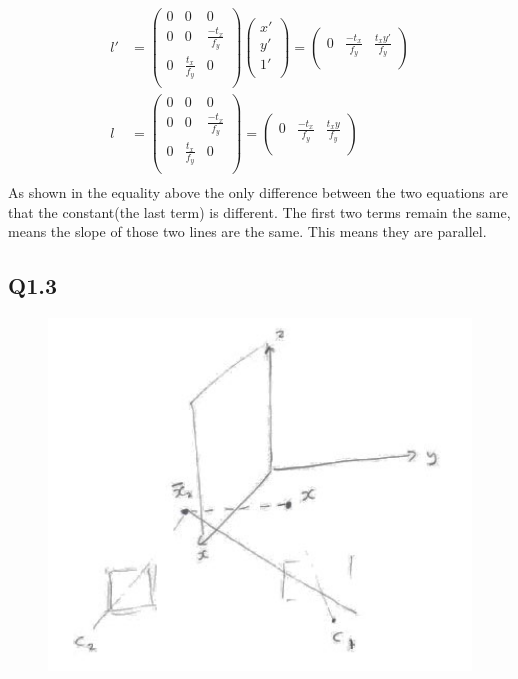 \documentclass{article}
\begin{document}
\begin{equation*}
\begin{aligned}
l' &=
\begin{pmatrix}
0& 0 & 0\\
0& 0 & \frac{-t_x}{f_y}\\
0& \frac{t_x}{f_y} & 0\\
\end{pmatrix}
\begin{pmatrix}
x'\\
y'\\
1'\\
\end{pmatrix}
=
\begin{pmatrix}
0&
\frac{-t_x}{f_y}&
\frac{t_x y'}{f_y}\\
\end{pmatrix}\\
l &=
\begin{pmatrix}
0& 0 & 0\\
0& 0 & \frac{-t_x}{f_y}\\
0& \frac{t_x}{f_y} & 0\\
\end{pmatrix}
=
\begin{pmatrix}
0&
\frac{-t_x}{f_y}&
\frac{t_x y}{f_y}\\
\end{pmatrix}\\
\end{aligned}
\end{equation*}
As shown in the equality above the only difference between the two equations are that the constant(the last term) is different. The first two terms remain the same, means the slope of those two lines are the same. This means they are parallel.
\subsection*{Q1.3}
\begin{figure}[H]
    \centering
    \includegraphics[width=6.5in]{./figures/q1_3}
\end{figure}
\end{document}
